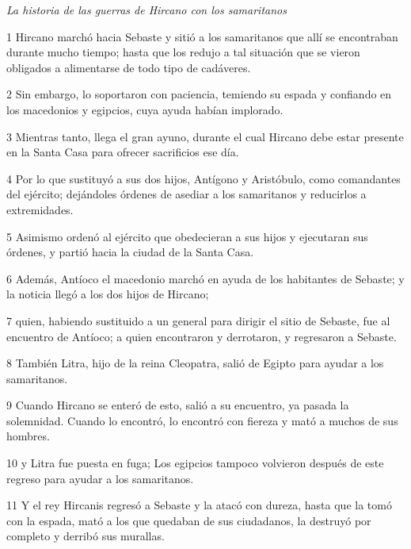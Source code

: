\par \textit{La historia de las guerras de Hircano con los samaritanos}

\par 1 Hircano marchó hacia Sebaste y sitió a los samaritanos que allí se encontraban durante mucho tiempo; hasta que los redujo a tal situación que se vieron obligados a alimentarse de todo tipo de cadáveres.

\par 2 Sin embargo, lo soportaron con paciencia, temiendo su espada y confiando en los macedonios y egipcios, cuya ayuda habían implorado.

\par 3 Mientras tanto, llega el gran ayuno, durante el cual Hircano debe estar presente en la Santa Casa para ofrecer sacrificios ese día.

\par 4 Por lo que sustituyó a sus dos hijos, Antígono y Aristóbulo, como comandantes del ejército; dejándoles órdenes de asediar a los samaritanos y reducirlos a extremidades.

\par 5 Asimismo ordenó al ejército que obedecieran a sus hijos y ejecutaran sus órdenes, y partió hacia la ciudad de la Santa Casa.

\par 6 Además, Antíoco el macedonio marchó en ayuda de los habitantes de Sebaste; y la noticia llegó a los dos hijos de Hircano;

\par 7 quien, habiendo sustituido a un general para dirigir el sitio de Sebaste, fue al encuentro de Antíoco; a quien encontraron y derrotaron, y regresaron a Sebaste.

\par 8 También Litra, hijo de la reina Cleopatra, salió de Egipto para ayudar a los samaritanos.

\par 9 Cuando Hircano se enteró de esto, salió a su encuentro, ya pasada la solemnidad. Cuando lo encontró, lo encontró con fiereza y mató a muchos de sus hombres.

\par 10 y Litra fue puesta en fuga; Los egipcios tampoco volvieron después de este regreso para ayudar a los samaritanos.

\par 11 Y el rey Hircanis regresó a Sebaste y la atacó con dureza, hasta que la tomó con la espada, mató a los que quedaban de sus ciudadanos, la destruyó por completo y derribó sus murallas.

